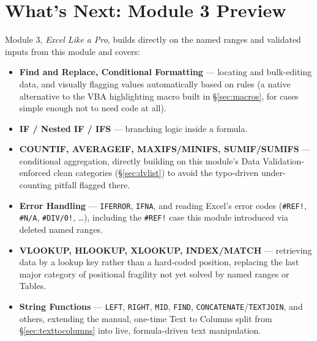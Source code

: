 \documentclass[11pt,a4paper]{article}
\begin{document}
\section{What's Next: Module 3 Preview}

Module 3, \textit{Excel Like a Pro}, builds directly on the named ranges and validated inputs from this module and covers:

\begin{itemize}
  \item \textbf{Find and Replace, Conditional Formatting} --- locating and bulk-editing data, and visually flagging values automatically based on rules (a native alternative to the VBA highlighting macro built in \S\ref{sec:macros}, for cases simple enough not to need code at all).
  \item \textbf{IF / Nested IF / IFS} --- branching logic inside a formula.
  \item \textbf{COUNTIF, AVERAGEIF, MAXIFS/MINIFS, SUMIF/SUMIFS} --- conditional aggregation, directly building on this module's Data Validation-enforced clean categories (\S\ref{sec:dvlist}) to avoid the typo-driven under-counting pitfall flagged there.
  \item \textbf{Error Handling} --- \texttt{IFERROR}, \texttt{IFNA}, and reading Excel's error codes (\texttt{\#REF!}, \texttt{\#N/A}, \texttt{\#DIV/0!}, \ldots), including the \texttt{\#REF!} case this module introduced via deleted named ranges.
  \item \textbf{VLOOKUP, HLOOKUP, XLOOKUP, INDEX/MATCH} --- retrieving data by a lookup key rather than a hard-coded position, replacing the last major category of positional fragility not yet solved by named ranges or Tables.
  \item \textbf{String Functions} --- \texttt{LEFT}, \texttt{RIGHT}, \texttt{MID}, \texttt{FIND}, \texttt{CONCATENATE}/\texttt{TEXTJOIN}, and others, extending the manual, one-time Text to Columns split from \S\ref{sec:texttocolumns} into live, formula-driven text manipulation.
\end{itemize}
\end{document}
